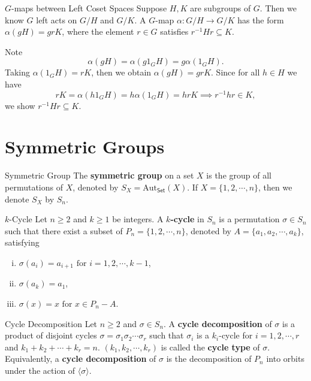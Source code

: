\begin{proposition}{$G$-maps between Left Coset Spaces}{}
    Suppose $H,K$ are subgroups of $G$. Then we know $G$ left acts on $G/H$ and $G/K$. A $G$-map $\alpha: G / H \longrightarrow G / K$ has the form $\alpha(g H)=g r K$, where the element $r \in G$ satisfies $r^{-1} H r\subseteq K$.
\end{proposition}

\begin{prf}
    Note
    \[
        \alpha(g H)=\alpha(g 1_G H)=g \alpha(1_G H).
    \]
    Taking $\alpha(1_G H)=r K$, then we obtain $\alpha(g H)=g r K$. Since for all $h\in H$ we have
    $$
        r K=\alpha(h1_G H)=h \alpha(1_G H)=hr K\implies r^{-1} h r \in K,
    $$
    we show $r^{-1} H r\subseteq K$.
\end{prf}


\section{Symmetric Groups}

\begin{definition}{Symmetric Group}{}
    The \textbf{symmetric group} on a set $X$ is the group of all permutations of $X$, denoted by $S_X=\mathrm{Aut}_{\mathsf{Set}}(X)$. If $X=\{1,2,\cdots,n\}$, then we denote $S_X$ by $S_n$.
\end{definition}

\begin{definition}{$k$-Cycle}{}
    Let $n\ge 2$ and $k\ge 1$ be integers. A \textbf{$k$-cycle} in $S_n$ is a permutation $\sigma\in S_n$ such that there exist a subset of $P_n=\{1,2,\cdots,n\}$, denoted by $A=\{a_1,a_2,\cdots,a_k\}$, satisfying
    \begin{enumerate}[(i)]
        \item $\sigma(a_i)=a_{i+1}\text{ for }i=1,2,\cdots,k-1$,
        \item $\sigma(a_k)=a_1$,
        \item $\sigma(x)=x\text{ for }x\in P_n-A$.
    \end{enumerate}
\end{definition}

\begin{definition}{Cycle Decomposition}{}
    Let $n\ge 2$ and $\sigma\in S_n$. A \textbf{cycle decomposition} of $\sigma$ is a product of disjoint cycles $\sigma=\sigma_1\sigma_2\cdots\sigma_r$ such that $\sigma_i$ is a $k_i$-cycle for $i=1,2,\cdots,r$ and $k_1+k_2+\cdots+k_r=n$. $(k_1,k_2,\cdots,k_r)$ is called the \textbf{cycle type} of $\sigma$. Equivalently, a \textbf{cycle decomposition} of $\sigma$ is the decomposition of $P_n$ into orbits under the action of $\langle\sigma\rangle$.
\end{definition}


